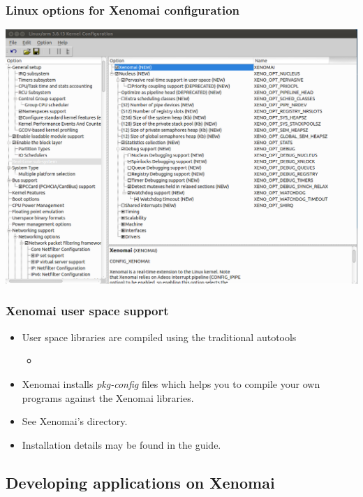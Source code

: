 \begin{frame}
  \frametitle{Linux options for Xenomai configuration}
  \begin{center}
    \includegraphics[width=\textwidth]{slides/sysdev-realtime/xenomai-kernel-config.png}
  \end{center}
\end{frame}

\begin{frame}
  \frametitle{Xenomai user space support}
  \begin{itemize}
  \item User space libraries are compiled using the traditional autotools
    \begin{itemize}
    \item {}
    \end{itemize}
  \item Xenomai installs {\em pkg-config} files which helps you to
    compile your own programs against the Xenomai libraries.
  \item See Xenomai's  directory.
  \item Installation details may be found in the 
    guide.
  \end{itemize}
\end{frame}

\subsection{Developing applications on Xenomai}

